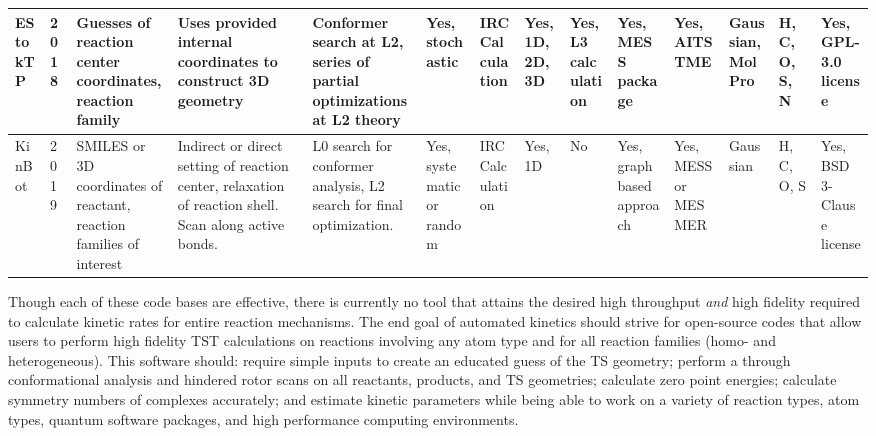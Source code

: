 \documentclass[preprint, 11pt]{elsarticle} %
\begin{document}
\begin{table}[h!]
\begin{center}
\begin{singlespace}
\begin{adjustbox}{angle=90}
\begin{scriptsize}
\begin{tabular}{m{0.45in}||m{0.25in} | m{0.45in} | m{0.8in} | m{0.7in}| m{0.5in}| m{0.5in }|m{0.45in}| m{0.45in}| m{0.5in}| m{0.45in}| m{0.5in}| m{0.5in} | m{0.45in}}
    \hline
    EStokTP & 2018 & Guesses of reaction center coordinates, reaction family & Uses provided internal coordinates to construct 3D geometry & Conformer search at L2, series of partial optimizations at L2 theory & Yes, stochastic & IRC Calculation &Yes, 1D, 2D, 3D & Yes, L3 calculation & Yes, MESS package & Yes, AITSTME & Gaussian, MolPro & H, C, O, S, N & Yes, GPL-3.0 license  \\ 
    \hline
    KinBot  & 2019 & SMILES or 3D coordinates of reactant, reaction families of interest & Indirect or direct setting of reaction center, relaxation of reaction shell. Scan along active bonds.  & L0 search for conformer analysis, L2 search for final optimization. & Yes, systematic or random & IRC Calculation & Yes, 1D & No & Yes, graph based approach & Yes, MESS or MESMER & Gaussian & H, C, O, S & Yes, BSD 3-Clause license \\ 
    \hline
   
\end{tabular}
\end{scriptsize}
\end{adjustbox}
\end{singlespace}
\end{center}
\end{table}
\restoregeometry
Though each of these code bases are effective, there is currently no tool that attains the desired high throughput \textit{and} high fidelity required to calculate kinetic rates for entire reaction mechanisms.
The end goal of automated kinetics should strive for open-source codes that allow users to perform high fidelity TST calculations on reactions involving any atom type and for all reaction families (homo- and heterogeneous).
This software should: require simple inputs to create an educated guess of the TS geometry; perform a through conformational analysis and hindered rotor scans on all reactants, products, and TS geometries; calculate zero point energies; calculate symmetry numbers of complexes accurately; and estimate kinetic parameters while being able to work on a variety of reaction types, atom types, quantum software packages, and high performance computing environments.
\end{document}
